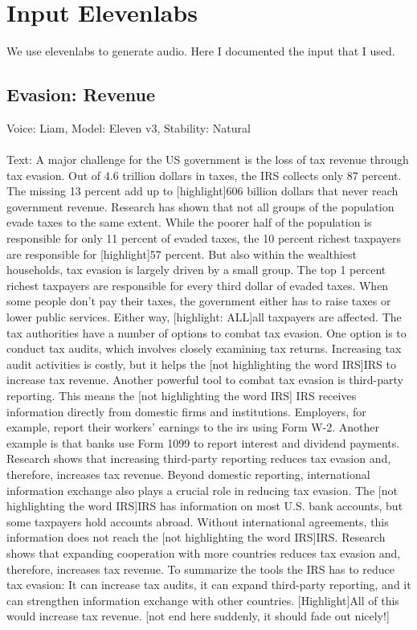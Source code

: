 \documentclass[11pt]{article}
\begin{document}
\section{Input Elevenlabs}
We use elevenlabs to generate audio. Here I documented the input that I used. 
\subsection{Evasion: Revenue}
Voice: Liam,
Model: Eleven v3,
Stability: Natural \\\\
Text: A major challenge for the US government is the loss of tax revenue through tax evasion. Out of 4.6 trillion dollars in taxes, the IRS collects only 87 percent. The missing 13 percent add up to [highlight]606 billion dollars that never reach government revenue. 
Research has shown that not all groups of the population evade taxes to the same extent. While the poorer half of the population is responsible for only 11 percent of evaded taxes, the 10 percent richest taxpayers are responsible for [highlight]57 percent. But also within the wealthiest households, tax evasion is largely driven by a small group. The top 1 percent richest taxpayers are responsible for every third dollar of evaded taxes.  
When some people don’t pay their taxes, the government either has to raise taxes or lower public services. Either way, [highlight: ALL]all taxpayers are affected.
The tax authorities have a number of options to combat tax evasion. One option is to conduct tax audits, which involves closely examining tax returns. Increasing tax audit activities is costly, but it helps the [not highlighting the word IRS]IRS to increase tax revenue.
Another powerful tool to combat tax evasion is third-party reporting. This means the [not highlighting the word IRS] IRS receives information directly from domestic firms and institutions. Employers, for example, report their workers’ earnings to the irs using Form W-2. Another example is that banks use Form 1099 to report interest and dividend payments. 
Research shows that increasing third-party reporting reduces tax evasion and, therefore, increases tax revenue.
Beyond domestic reporting, international information exchange also plays a crucial role in reducing tax evasion. The [not highlighting the word IRS]IRS has information on most U.S. bank accounts, but some taxpayers hold accounts abroad. Without international agreements, this information does not reach the [not highlighting the word IRS]IRS. Research shows that expanding cooperation with more countries reduces tax evasion and, therefore, increases tax revenue.
To summarize the tools the IRS has to reduce tax evasion: It can increase tax audits, it can expand third-party reporting, and it can strengthen information exchange with other countries. [Highlight]All of this would increase tax revenue. [not end here suddenly, it should fade out nicely!]
\end{document}
